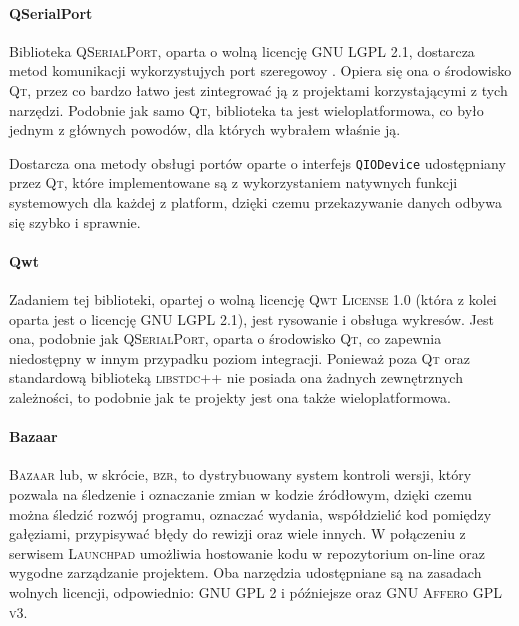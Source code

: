\paragraph{QSerialPort}
Biblioteka \textsc{QSerialPort}, oparta o wolną licencję \textsc{GNU LGPL 2.1}, dostarcza metod komunikacji wykorzystujych port szeregowoy . Opiera się ona o środowisko \textsc{Qt}, przez co bardzo łatwo jest zintegrować ją z projektami korzystającymi z tych narzędzi. Podobnie jak samo \textsc{Qt}, biblioteka ta jest wieloplatformowa, co było jednym z głównych powodów, dla których wybrałem właśnie ją.

Dostarcza ona metody obsługi portów oparte o interfejs \verb|QIODevice| udostępniany przez \textsc{Qt}, które implementowane są z wykorzystaniem natywnych funkcji systemowych dla każdej z platform, dzięki czemu przekazywanie danych odbywa się szybko i sprawnie.

\paragraph{Qwt}
Zadaniem tej biblioteki, opartej o wolną licencję \textsc{Qwt License 1.0} (która z kolei oparta jest o licencję \textsc{GNU LGPL 2.1}), jest rysowanie i obsługa wykresów. Jest ona, podobnie jak \textsc{QSerialPort}, oparta o środowisko \textsc{Qt}, co zapewnia niedostępny w innym przypadku poziom integracji. Ponieważ poza \textsc{Qt} oraz standardową biblioteką \textsc{libstdc++} nie posiada ona żadnych zewnętrznych zależności, to podobnie jak te projekty jest ona także wieloplatformowa.

\paragraph{Bazaar}
\textsc{Bazaar} lub, w skrócie, \textsc{bzr}, to dystrybuowany system kontroli wersji, który pozwala na śledzenie i oznaczanie zmian w kodzie źródłowym, dzięki czemu można śledzić rozwój programu, oznaczać wydania, współdzielić kod pomiędzy gałęziami,  przypisywać błędy do rewizji oraz wiele innych. W połączeniu z serwisem \textsc{Launchpad} umożliwia hostowanie kodu w repozytorium on-line oraz wygodne zarządzanie projektem. Oba narzędzia udostępniane są na zasadach wolnych licencji, odpowiednio: \textsc{GNU GPL 2} i późniejsze oraz \textsc{GNU Affero GPL v3}.

